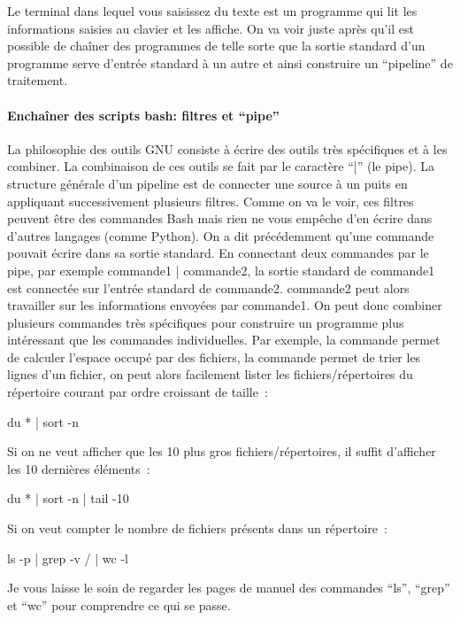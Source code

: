 Le terminal dans lequel vous saisissez du texte est un programme qui lit les informations saisies au clavier et les affiche. On va voir juste après qu'il est possible de chaîner des programmes de telle sorte que la sortie standard d'un programme serve d'entrée standard à un autre et ainsi construire un ``pipeline'' de traitement. 

\paragraph{Enchaîner des scripts bash: filtres et ``pipe''}

La philosophie des outils GNU consiste à écrire des outils très spécifiques et à les combiner. La combinaison de ces outils se fait par le caractère ``|'' (le pipe). La structure générale d'un pipeline est de connecter une source à un puits en appliquant successivement plusieurs filtres. Comme on va le voir, ces filtres peuvent être des commandes Bash mais rien ne vous empêche d'en écrire dans d'autres langages (comme Python). On a dit précédemment qu'une commande pouvait écrire dans sa sortie standard. En connectant deux commandes par le pipe, par exemple commande1 | commande2, la sortie standard de commande1 est connectée sur l'entrée standard de commande2. commande2 peut alors travailler sur les informations envoyées par commande1. On peut donc combiner plusieurs commandes très spécifiques pour construire un programme plus intéressant que les commandes individuelles. Par exemple, la commande \du permet de calculer l'espace occupé par des fichiers, la commande \sort permet de trier les lignes d'un fichier, on peut alors facilement lister les fichiers/répertoires du répertoire courant par ordre croissant de taille~:
\begin{center}
du * | sort -n
\end{center}

Si on ne veut afficher que les 10 plus gros fichiers/répertoires, il suffit d'afficher les 10 dernières éléments~:
\begin{center}
du * | sort -n | tail -10 
\end{center}

Si on veut compter le nombre de fichiers présents dans un répertoire~:

\begin{center}
ls -p | grep -v / | wc -l
\end{center}

Je vous laisse le soin de regarder les pages de manuel des commandes ``ls'', ``grep'' et ``wc'' pour comprendre ce qui se passe.


